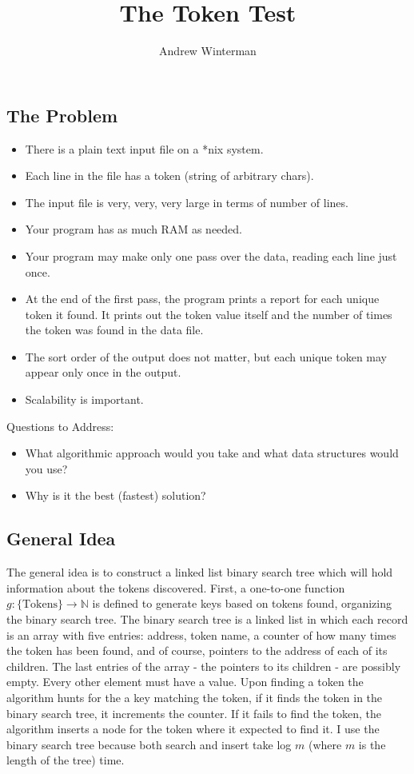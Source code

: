 \documentclass{article}
\begin{document}
\title{The Token Test}
\author{Andrew Winterman}

\maketitle
\subsection*{The Problem}

\begin{itemize}
\item   There is a plain text input file on a *nix system.
\item  Each line in the file has a token (string of arbitrary chars).
\item The input file is very, very, very large in terms of number of lines.
\item Your program has as much RAM as needed.
\item Your program may make only one pass over the data, reading each line just once.
\item At the end of the first pass, the program prints a report for each unique token it found.  It prints out the token value itself and the number of times the token was found in the data file.
\item  The sort order of the output does not matter, but each unique token may appear only once in the output.
\item Scalability is important.
\end{itemize}
 Questions to Address:
\begin{itemize}
\item What algorithmic approach would you take and what data structures would you use?
\item Why is it the best (fastest) solution?
\end{itemize}
\subsection*{General Idea}

The general idea is to construct a linked list binary search tree which will hold information about the tokens discovered. First, a one-to-one function $g : \{\mathrm{Tokens}\} \to \mathbb{N}$ is defined to generate keys based on tokens found, organizing the binary search tree. The binary search tree is a linked list in which each record is an array with five entries: address, token name, a counter of how many times the token has been found, and of course, pointers to the address of each of its children. The last entries of the array - the pointers to its children - are possibly empty. Every other element must have a value. Upon finding a token the algorithm hunts for the a key matching the token, if it finds the token in the binary search tree, it increments the counter. If it fails to find the token, the algorithm inserts a node for the token where it expected to find it. I use the binary search tree because both search and insert take log $m$ (where $m$ is the length of the tree) time. 
\end{document}

